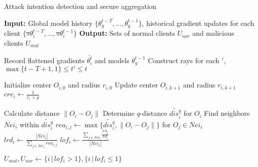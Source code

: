 \documentclass[a4paper,twoside,11pt,dvipsnames]{reviewresponse}
\begin{document}
\begin{algorithm}[!t]
\caption{Attack intention detection and secure aggregation}
\label{alg:malicious-node-detection-history}
\begin{algorithmic}[1]
\State \textbf{Input:} Global model history $\{\theta_g^{t-T}, \dots, \theta_g^{t-1}\}$, historical gradient updates for each client $\{\triangledown \theta_{i}^{t-T}, \dots, \triangledown \theta_{i}^{t-1}\}$
\State \textbf{Output:} Sets of normal clients $U_{nor}$ and malicious clients $U_{mal}$



    \State Record flattened gradients $\bar{\theta_i^t}$ and models $\theta_g^{t-1}$
    \State Construct rays for each $'$, $\max\{t-T+1, 1\}\leq t' \leq t$



    \State Initialize center $O_{i,0}$ and radius $r_{i,0}$
        \State Update center $O_{i,k+1}$ and radius $r_{i,k+1}$
    \EndWhile
    \State  $cre_i  \gets \frac{1}{r_i + \rho}$ 



        \State Calculate distance $\|O_i - O_j\|$
    \EndFor
    \State Determine $q$-distance $\widetilde{dis_i^q}$ for $O_i$
    \State Find neighbors $Nei_i$ within $\widetilde{dis_i^q}$
    \State $rea_{i,j}  \gets \max\{\widetilde{dis_i^q}, \|O_i - O_j\|\}$ for $O_j \in Nei_i$  
    \State  $lrd_i  \gets \frac{|Nei_i|}{\sum_{j \in Nei_i} rea_{i,j}}$ 
    \State $lof_i  \gets \frac{\sum_{j \in Nei_i} \frac{lrd_j}{lrd_i}}{|Nei_i|}$

\State $U_{mal}, U_{nor}  \gets \{i \,|\, lof_i > 1\}, \{i \,|\, lof_i \leq 1\}$


\end{algorithmic}
\end{algorithm}
\end{document}
